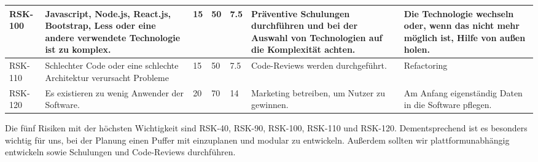\begin{landscape}
\begin{longtable}{|p{1.5cm}|p{4.5cm}|p{0.4cm}|p{0.4cm}|p{0.8cm}|p{4.5cm}|p{4.5cm}|}
		\\ \hline

		RSK-100	& Javascript, Node.js, React.js, Bootstrap, Less oder eine andere verwendete Technologie ist zu komplex.
				& 15 	& 50 	& 7.5 	& Präventive Schulungen durchführen und bei der Auswahl von Technologien auf die Komplexität achten. 
								& Die Technologie wechseln oder, wenn das nicht mehr möglich ist, Hilfe von außen holen.

		\\ \hline

		RSK-110	& Schlechter Code oder eine schlechte Architektur verursacht Probleme
				& 15 	& 50 	& 7.5 	& Code-Reviews werden durchgeführt.
								& Refactoring

		\\ \hline
		
		RSK-120	& Es existieren zu wenig Anwender der Software.
				& 20 	& 70 	& 14 	& Marketing betreiben, um Nutzer zu gewinnen.
								& Am Anfang eigenständig Daten in die Software pflegen.

		\\ \hline

	\end{longtable}

	Die fünf Risiken mit der höchsten Wichtigkeit sind RSK-40, RSK-90, RSK-100, RSK-110 und RSK-120. Dementsprechend ist es besonders wichtig für uns, bei der Planung einen Puffer mit einzuplanen und modular zu entwickeln. Außerdem sollten wir plattformunabhängig entwickeln sowie Schulungen und Code-Reviews durchführen. 
\end{landscape}
